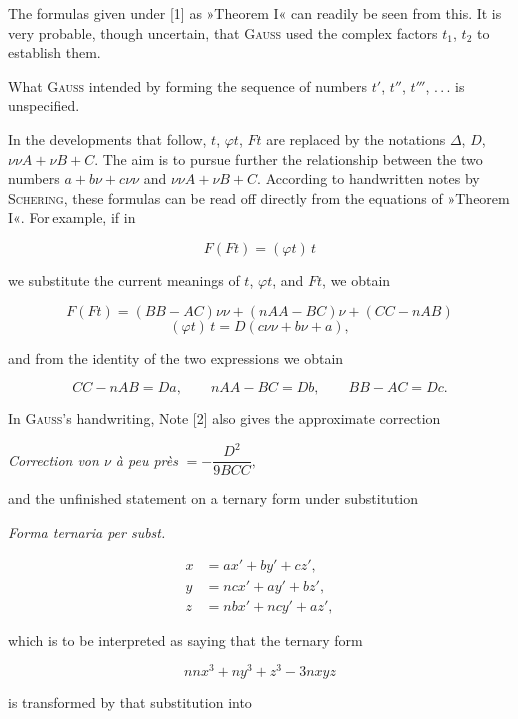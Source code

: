 \noindent\hspace*{\parindent}The formulas given under [1] as »Theorem I« can readily be seen from this.
It is very probable, though uncertain, that
\textsc{Gauss} used the complex factors $t_1$, $t_2$
to establish them.

What \textsc{Gauss} intended by forming the sequence of numbers $t'$, $t''$, $t'''$,
.\,.\,. is unspecified.

In the developments that follow, $t$, $\varphi t$,
$Ft$ are replaced by the notations $\Delta$, $D$, $\nu\nu A+\nu B+C$. The aim is
to pursue further the relationship between the two numbers $a+b\nu+c\nu\nu$ and
$\nu\nu A+\nu B+C$. According to handwritten notes by
\textsc{Schering}, these formulas can be read off directly from the equations of
»Theorem I«. For\,example, if in

\[
F(Ft) = (\varphi t)\,t
\]

\noindent we substitute the current meanings of $t$, $\varphi t$, and $Ft$, we obtain

\[
F(Ft) = (BB-AC)\nu\nu + (nAA-BC)\nu + (CC-nAB)
\]
\[
(\varphi t)\,t = D(c\nu\nu+b\nu+a),
\]

\noindent and from the identity of the two expressions we obtain

\[
CC-nAB = Da, \qquad nAA-BC = Db, \qquad BB-AC = Dc.
\]

In \textsc{Gauss}'s handwriting, Note [2] also gives the approximate correction

\begin{center}\textit{Correction von $\nu$ à peu près} $= -\dfrac{D^2}{9BCC},$\end{center}

\noindent and the unfinished statement on a ternary form under substitution

\begin{center}\textit{Forma ternaria per subst.}\end{center}
\[
\begin{aligned}
x &= ax'+by'+cz', \\
y &= ncx'+ay'+bz', \\
z &= nbx'+ncy'+az',
\end{aligned}
\]

\noindent which is to be interpreted as saying that the ternary form

\[
nnx^3+ny^3+z^3-3nxyz
\]

\noindent is transformed by that substitution into


